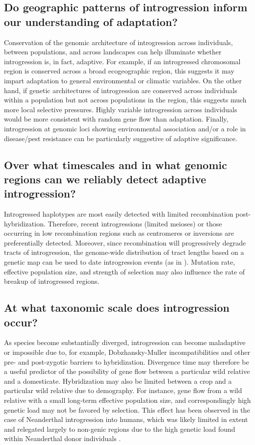 \documentclass[11pt]{article}
\begin{document}
\subsection*{Do geographic patterns of introgression inform our understanding of adaptation?}
Conservation of the genomic architecture of introgression across individuals,  between populations, and across landscapes can help illuminate whether introgression is, in fact, adaptive.
For example, if an introgressed chromosomal region is conserved across a broad ecogeographic region, this suggests it may impart adaptation to general environmental or climatic variables.
On the other hand, if genetic architectures of introgression are conserved across individuals within a population but not across populations in the region, this suggests much more local selective pressures.
Highly variable introgression across individuals would be more consistent with random gene flow than adaptation.
Finally, introgression at genomic loci showing environmental association and/or a role in disease/pest resistance can be particularly suggestive of adaptive significance.

\subsection*{Over what timescales and in what genomic regions can we reliably detect adaptive introgression?}
Introgressed haplotypes are most easily detected with limited recombination post-hybridization.
Therefore, recent introgressions (limited meioses) or those occurring in low recombination regions such as centromeres or inversions are preferentially detected.
Moreover, since recombination will progressively degrade tracts of introgression, the genome-wide distribution of tract lengths based on a genetic map can be used to date introgression events (as in \cite{Poets2015}).
Mutation rate, effective population size, and strength of selection may also influence the rate of breakup of introgressed regions.

\subsection*{At what taxonomic scale does introgression occur?}
As species become substantially diverged, introgression can become maladaptive or impossible due to, for example, Dobzhansky-Muller incompatibilities and other pre- and post-zygotic barriers to hybridization.
Divergence time may therefore be a useful predictor of the possibility of gene flow between a particular wild relative and a domesticate.
Hybridization may also be limited between a crop and a particular wild relative due to demography. 
For instance, gene flow from a wild relative with a small long-term effective population size, and correspondingly high genetic load may not be favored by selection.
This effect has been observed in the case of Neanderthal introgression into humans, which was likely limited in extent and relegated largely to non-genic regions due to the high genetic load found within Neanderthal donor individuals \cite{harris2016genetic}.
\end{document}
